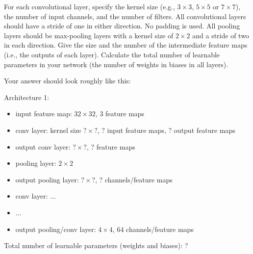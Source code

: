 \documentclass[a4paper,12pt]{article}
\begin{document}
For each convolutional layer, specify the kernel size (e.g., $3 \times 3$, $5 \times 5$ or $7 \times 7$), the number of input channels, and the number of filters. 
All convolutional layers should have a stride of one in either direction. No padding is used. 
All pooling layers should be max-pooling layers with a kernel size of $2 \times 2$ and a stride of two in each direction. 
Give the size and the number of the intermediate feature maps (i.e., the outputs of each layer).
Calculate the total number of learnable parameters in your network (the number of weights in biases in all layers).


Your answer should look roughly like this: 

\noindent Architecture 1:
\begin{itemize}
    \item input feature map: $32 \times 32$, $3$ feature maps
    \item conv layer: kernel size $? \times ?$, $?$ input feature maps, $?$ output feature maps
    \item output conv layer: $? \times ?$, $?$ feature maps
    \item pooling layer: $2 \times 2$
    \item output pooling layer: $? \times ?$, $?$ channels/feature maps
    \item conv layer: ...
    \item ...
    \item output pooling/conv layer: $4 \times 4$, $64$ channels/feature maps
\end{itemize}
Total number of learnable parameters (weights and biases): ? 
\end{document}

